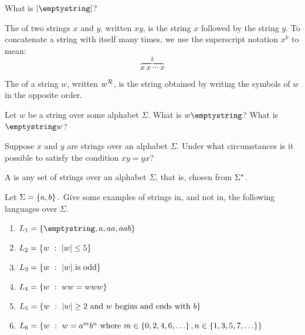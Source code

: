\begin{exer}
What is $|\emptystring|$?
\end{exer}

\begin{defn}
The  of two strings $x$ and $y$, written $xy$, is the string $x$ followed by the string $y$. To concatenate a string with itself many times, we use the superscript notation $x^k$ to mean:
\[\overbrace{x\,x\,\cdots\,x}^k\]
\end{defn}

\begin{defn}
The  of a string $w$, written $w^{\mathcal{R}}$, is the string obtained by writing the symbols of $w$ in the opposite order.
\end{defn}

\begin{exer}
Let $w$ be a string over some alphabet $\Sigma$. What is $w\emptystring$? What is $\emptystring w$?
\end{exer}

\begin{exer}
Suppose $x$ and $y$ are strings over an alphabet $\Sigma$. Under what circumstances is it possible to satisfy the condition $xy = yx$? 
\end{exer}

\begin{defn}[Language]
A  is any set of strings over an alphabet $\Sigma$, that is, chosen from $\Sigma^{*}$.
\end{defn}

\begin{exer}\label{exer:strslang}
Let $\Sigma = \left\lbrace a, b \right\rbrace.$ Give some examples of strings in, and not in, the following languages over $\Sigma$.
\begin{enumerate}[label=(\alph*)]
\item $L_1 = \setdef{ \emptystring, a, aa, aab }$
\item $L_2 = \left\lbrace w\ :\ |w| \leq 5 \right\rbrace$
\item $L_3 = \left\lbrace w\ :\ |w|~\textrm{is odd} \right\rbrace$
\item $L_4 = \left\lbrace w\ :\ ww = www \right\rbrace$
\item $L_5 = \left\lbrace w\ :\ |w| \geq 2 ~\textrm{and $w$ begins and ends with $b$} \right\rbrace$
\item $L_6 = \left\lbrace w\ :\ w = a^m b^n ~\textrm{where}~ m \in \left\lbrace 0, 2, 4, 6, \ldots \right\rbrace, n \in \left\lbrace 1, 3, 5, 7, \ldots \right\rbrace \right\rbrace$
\end{enumerate}
\end{exer}

